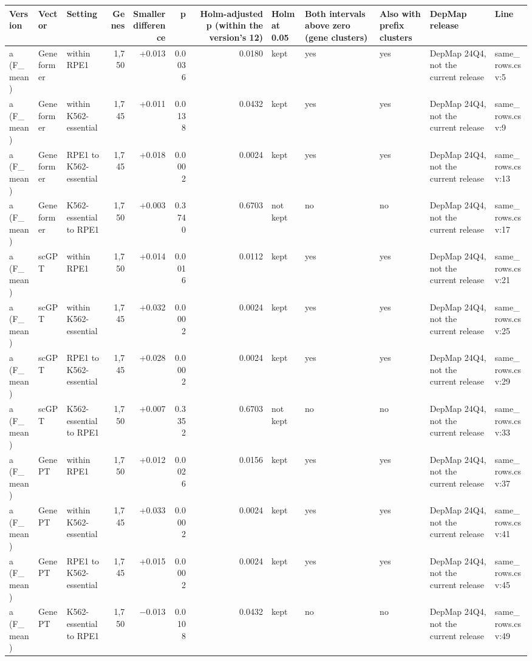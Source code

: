 \begin{tabular}{lllrrrrllll}
\toprule
Version & Vector & Setting & Genes & Smaller difference & p & Holm-adjusted p (within the version's 12) & Holm at 0.05 & Both intervals above zero (gene clusters) & Also with prefix clusters & DepMap release & Line \\
\midrule
a (F\_mean) & Geneformer & within RPE1 & 1,750 & +0.013 & 0.0036 & 0.0180 & kept & yes & yes & DepMap 24Q4, not the current release & same\_rows.csv:5 \\
a (F\_mean) & Geneformer & within K562-essential & 1,745 & +0.011 & 0.0138 & 0.0432 & kept & yes & yes & DepMap 24Q4, not the current release & same\_rows.csv:9 \\
a (F\_mean) & Geneformer & RPE1 to K562-essential & 1,745 & +0.018 & 0.0002 & 0.0024 & kept & yes & yes & DepMap 24Q4, not the current release & same\_rows.csv:13 \\
a (F\_mean) & Geneformer & K562-essential to RPE1 & 1,750 & +0.003 & 0.3740 & 0.6703 & not kept & no & no & DepMap 24Q4, not the current release & same\_rows.csv:17 \\
a (F\_mean) & scGPT & within RPE1 & 1,750 & +0.014 & 0.0016 & 0.0112 & kept & yes & yes & DepMap 24Q4, not the current release & same\_rows.csv:21 \\
a (F\_mean) & scGPT & within K562-essential & 1,745 & +0.032 & 0.0002 & 0.0024 & kept & yes & yes & DepMap 24Q4, not the current release & same\_rows.csv:25 \\
a (F\_mean) & scGPT & RPE1 to K562-essential & 1,745 & +0.028 & 0.0002 & 0.0024 & kept & yes & yes & DepMap 24Q4, not the current release & same\_rows.csv:29 \\
a (F\_mean) & scGPT & K562-essential to RPE1 & 1,750 & +0.007 & 0.3352 & 0.6703 & not kept & no & no & DepMap 24Q4, not the current release & same\_rows.csv:33 \\
a (F\_mean) & GenePT & within RPE1 & 1,750 & +0.012 & 0.0026 & 0.0156 & kept & yes & yes & DepMap 24Q4, not the current release & same\_rows.csv:37 \\
a (F\_mean) & GenePT & within K562-essential & 1,745 & +0.033 & 0.0002 & 0.0024 & kept & yes & yes & DepMap 24Q4, not the current release & same\_rows.csv:41 \\
a (F\_mean) & GenePT & RPE1 to K562-essential & 1,745 & +0.015 & 0.0002 & 0.0024 & kept & yes & yes & DepMap 24Q4, not the current release & same\_rows.csv:45 \\
a (F\_mean) & GenePT & K562-essential to RPE1 & 1,750 & −0.013 & 0.0108 & 0.0432 & kept & no & no & DepMap 24Q4, not the current release & same\_rows.csv:49 \\

\end{tabular}
